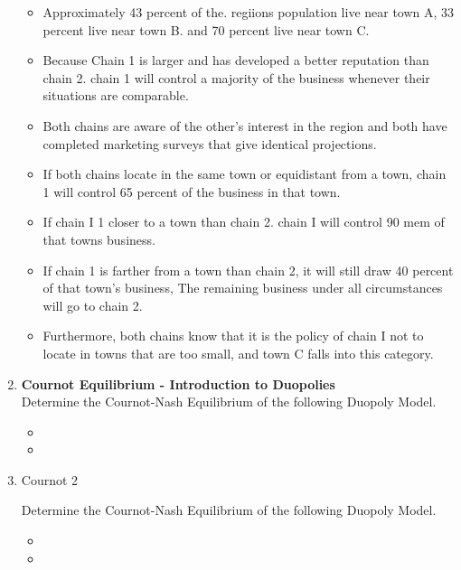 \documentclass[]{report}
\begin{document}
\begin{enumerate}
\begin{itemize}
	\item Approximately 43 percent of the. regiions population live near town A, 33 
	percent live near town B. and 70 percent live near town C. 
	\item Because Chain 1 is larger and has 
	developed a better reputation than chain 2. chain 1 will control a majority of the business 
	whenever their situations are comparable. 
	\item 
	Both chains are aware of the other's interest in the region and both have completed marketing surveys that give identical projections.
	\item  If 
	both chains locate in the same town or equidistant from a town, chain 1 will control 65 percent of the business in that town. 
	\item
	If chain I 1 closer to a town than chain 2. chain I will control 90 mem of that towns business. 
	\item If chain 1 is farther from a town 
	than chain 2, it will still draw 40 percent of that town's business, The remaining business under all circumstances will go to chain 2. 
	\item Furthermore, both chains know that it is the policy of chain I not to locate in towns that are too small, and town C falls into this category. 
	
\end{itemize}


\item \textbf{Cournot Equilibrium - Introduction to Duopolies}\\%


Determine the Cournot-Nash Equilibrium of the following Duopoly Model.

\begin{itemize}
	
	\item
	
	\item
	
\end{itemize}

\item Cournot 2


Determine the Cournot-Nash Equilibrium of the following Duopoly Model.

\begin{itemize}
	
	\item
	
	\item
	

\end{itemize}
\end{enumerate}
\end{document}
